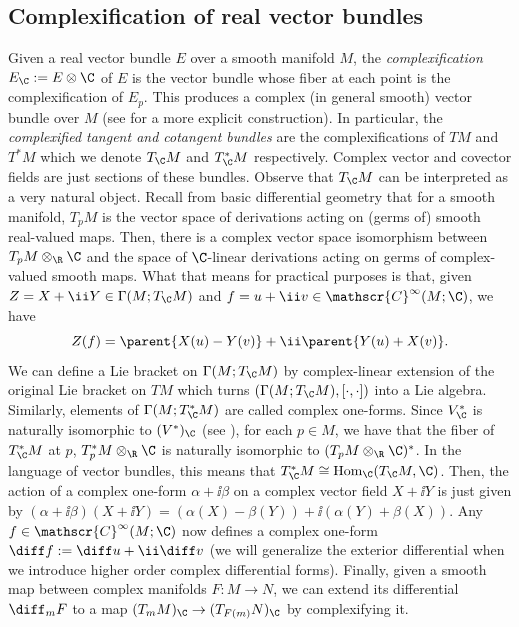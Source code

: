 \subsection{Complexification of real vector bundles}
Given a real vector bundle \(E\) over a smooth manifold \(M\), the \textit{complexification} \(E_\C:=E \otimes \C\) of \(E\) is the vector bundle whose fiber at each point is the complexification of \(E_p\). This produces a complex (in general smooth) vector bundle over \(M\) (see \parencite[Ch. 1]{lee_introCM} for a more explicit construction). In particular, the \textit{complexified tangent and cotangent bundles} are the complexifications of \(TM\) and \(T^*M\) which we denote \(T_\C M\) and \(T_\C^* M\) respectively. Complex vector and covector fields are just sections of these bundles. Observe that \(T_\C M\) can be interpreted as a very natural object. Recall from basic differential geometry that for a smooth manifold, \(T_pM\) is the vector space of derivations acting on (germs of) smooth real-valued maps. Then, there is a complex vector space isomorphism between \(T_pM \otimes_\R \C\) and the space of \(\C\)-linear derivations acting on germs of complex-valued smooth maps. What that means for practical purposes is that, given \(Z=X+\ii Y \in \Gamma(M; T_\C M)\) and \(f=u+\ii v \in \mathscr{C}^\infty(M;\C)\), we have 
\[
Z(f)=\parent{X(u)-Y(v)} + \ii \parent{Y(u)+X(v)}.
\]
We can define a Lie bracket on \(\Gamma(M; T_\C M)\) by complex-linear extension of the original Lie bracket on \(TM\) which turns \((\Gamma(M; T_\C M), [\cdot, \cdot])\) into a Lie algebra. Similarly, elements of \(\Gamma(M; T_\C^*M)\) are called complex one-forms. Since \(V_\C^*\) is naturally isomorphic to \((V^*)_\C\) (see \parencite[Lemma 1.2.6]{huybrechts2005complex}), for each \(p \in M\), we have that the fiber of \(T_\C^*M\) at \(p\), \(T_p^*M \otimes _\R \C\) is naturally isomorphic to \((T_pM \otimes_\R  \C)^*\). In the language of vector bundles, this means that \(T_\C^* M \cong \mathrm{Hom}_\C(T_\C M, \C)\). Then, the action of a complex one-form \(\alpha + \ii \beta\) on a complex vector field \(X + \ii Y\) is just given by \((\alpha + \ii \beta)(X+\ii Y)=(\alpha(X)-\beta(Y))+\ii (\alpha(Y)+\beta(X))\). Any \(f \in \mathscr{C}^\infty(M;\C)\) now defines a complex one-form \(\diff f:=\diff u + \ii \diff v\) (we will generalize the exterior differential when we introduce higher order complex differential forms). Finally, given a smooth map between complex manifolds \(F\colon M \to N\), we can extend its differential \(\diff_m F\) to a map \((T_mM)_\C \to (T_{F(m)}N)_\C\) by complexifying it.

